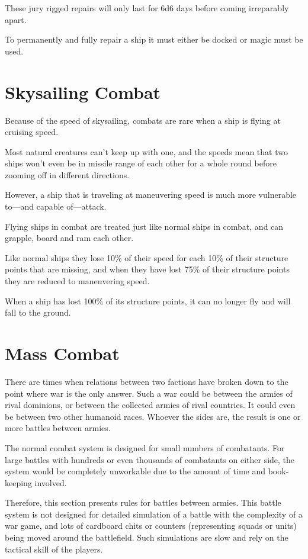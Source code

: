 \begin{multicols*}{2}
These jury rigged repairs will only last for 6d6 days before coming irreparably apart.

To permanently and fully repair a ship it must either be docked or magic must be used.

\section{Skysailing Combat}
Because of the speed of skysailing, combats are rare when a ship is flying at cruising speed.

Most natural creatures can’t keep up with one, and the speeds mean that two ships won’t even be in missile range of each other for a whole round before zooming off in different directions.

However, a ship that is traveling at maneuvering speed is much more vulnerable to—and capable of—attack.

Flying ships in combat are treated just like normal ships in combat, and can grapple, board and ram each other.

Like normal ships they lose 10\% of their speed for each 10\% of their structure points that are missing, and when they have lost 75\% of their structure points they are reduced to maneuvering speed.

When a ship has lost 100\% of its structure points, it can no longer fly and will fall to the ground.

\section{Mass Combat}\label{sec:Mass Combat}
There are times when relations between two factions have broken down to the point where war is the only answer. Such a war could be between the armies of rival dominions, or between the collected armies of rival countries. It could even be between two other humanoid races. Whoever the sides are, the result is one or more battles between armies.

The normal combat system is designed for small numbers of combatants. For large battles with hundreds or even thousands of combatants on either side, the system would be completely unworkable due to the amount of time and book-keeping involved.

Therefore, this section presents rules for battles between armies. This battle system is not designed for detailed simulation of a battle with the complexity of a war game, and lots of cardboard chits or counters (representing squads or units) being moved around the battlefield. Such simulations are slow and rely on the tactical skill of the players.


\end{multicols*}

